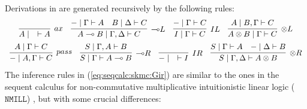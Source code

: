 \documentclass[a4paper,UKenglish,cleveref, autoref, thm-restate, anonymous]{lipics-v2021}
\newcommand{\tl}{\otimes \mathsf{L}}
\newcommand{\tr}{\otimes\mathsf{R}}
\newcommand{\pass}{\mathsf{pass}}
\newcommand{\unitl}{\mathsf{IL}}
\newcommand{\unitr}{\mathsf{IR}}
\newcommand{\ax}{\mathsf{ax}}
\newcommand{\ot}{\otimes}
\newcommand{\lolli}{\multimap}
\newcommand{\lleft}{{\lolli}\mathsf{L}}
\newcommand{\lright}{{\lolli}\mathsf{R}}
\newcommand{\illol}{\rotatebox[origin=c]{180}{$\multimap$}}
\newcommand{\I}{\mathsf{I}}
\newcommand{\vdG}{\vdash}
\newcommand{\NMILL}{$\mathtt{NMILL}$}
\newcommand{\LSkG}{$\mathtt{LSkG}$}
\begin{document}
Derivations in are generated recursively by the following rules:
\begin{equation}\label{eq:seqcalc:skmc:Gir}
	  \begin{array}{c}
		\infer[\ax]{A \mid \quad \vdG A}{}
		\quad
		\infer[\lleft]{A \lolli B \mid \Gamma , \Delta \vdG C}{
		  {-} \mid \Gamma \vdG A
		  &
		  B \mid \Delta \vdG C
		}
		\quad
		\infer[\unitl]{\I \mid \Gamma \vdG C}{{-} \mid \Gamma \vdG C}
		\quad
		\infer[\tl]{A \ot B \mid \Gamma \vdG C}{A \mid B , \Gamma \vdG C}
		\\[5pt]
    \infer[\pass]{{-} \mid A , \Gamma \vdG C}{A \mid \Gamma \vdG C}
		\quad
		\infer[\lright]{S \mid \Gamma \vdG A \lolli B}{S \mid \Gamma , A \vdG B}
		\quad
		\infer[\unitr]{{-} \mid \quad \vdG \I}{}
		\quad
		\infer[\tr]{S \mid \Gamma , \Delta \vdG A \ot B}{
		  S \mid \Gamma \vdG A
		  &
		  {-} \mid \Delta \vdG B
		}
	  \end{array}
	\end{equation}
The inference rules in (\ref{eq:seqcalc:skmc:Gir}) are similar to the ones in the sequent calculus for non-commutative multiplicative intuitionistic linear logic (\NMILL) \cite{abrusci:noncommutative:1990}, but with some crucial differences: 
\end{document}
